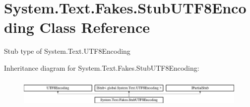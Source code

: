 \hypertarget{class_system_1_1_text_1_1_fakes_1_1_stub_u_t_f8_encoding}{\section{System.\-Text.\-Fakes.\-Stub\-U\-T\-F8\-Encoding Class Reference}
\label{class_system_1_1_text_1_1_fakes_1_1_stub_u_t_f8_encoding}
}


Stub type of System.\-Text.\-U\-T\-F8\-Encoding 


Inheritance diagram for System.\-Text.\-Fakes.\-Stub\-U\-T\-F8\-Encoding\-:\begin{figure}[H]
\begin{center}
\leavevmode
\includegraphics[height=1.414141cm]{class_system_1_1_text_1_1_fakes_1_1_stub_u_t_f8_encoding}
\end{center}
\end{figure}
